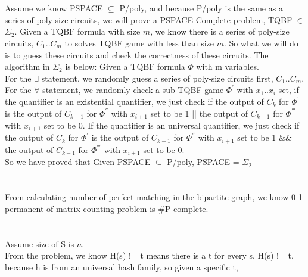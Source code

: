 \documentclass[11pt]{article}
\begin{document}
\part{}
Assume we know PSPACE $\subseteq$ P/poly, and because P/poly is the same as a series of poly-size circuits, we will prove a PSPACE-Complete problem, TQBF $\in$ $\Sigma_{2}$. Given a TQBF formula with size $m$, we know there is a series of poly-size circuits, $C_{1}..C_{m}$ to solves TQBF game with less than size $m$. So what we will do is to guess these circuits and check the correctness of these circuits. The algorithm in $\Sigma_{2}$ is below:
Given a TQBF formula $\Phi$ with m variables. \\
For the $\exists$ statement, we randomly guess a series of poly-size circuits first, $C_{1}..C_{m}$. \\
For the $\forall$ statement, we randomly check a sub-TQBF game $\Phi^{'}$ with $x_{1}..x_{i}$ set, if the quantifier is an existential quantifier, we just check if the output of $C_{k}$ for $\Phi^{'}$ is 
the output of $C_{k-1}$ for $\Phi^{''}$ with $x_{i+1}$ set to be 1 || the output of $C_{k-1}$ for $\Phi^{'''}$ with $x_{i+1}$ set to be 0. If the quantifier is an universal quantifier, we just check if the output of $C_{k}$ for $\Phi^{'}$ is the output of $C_{k-1}$ for $\Phi^{''}$ with $x_{i+1}$ set to be 1 \&\& the output of $C_{k-1}$ for $\Phi^{'''}$ with $x_{i+1}$ set to be 0. \\
So we have proved that Given PSPACE $\subseteq$ P/poly, PSPACE = $\Sigma_{2}$
\part{}
From calculating number of perfect matching in the bipartite graph, we know 0-1 permanent of matrix counting problem is \#P-complete.
\part{}
Assume size of S is $n$. \\
From the problem, we know H(s) != t means there is a t for every s, H(s) != t, because h is from an universal hash family, so given a specific t, 
\end{document}
